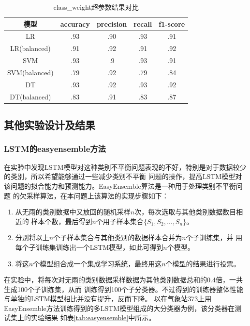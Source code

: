 \documentclass[UTF8]{ctexart}
\begin{document}
\begin{table}[htb]
  \centering
  \begin{minipage}[t]{\linewidth}
  \centering
  \caption{class\_weight超参数结果对比}
  \label{tab:class}
    \begin{tabular}{ccccc}
      \toprule[1pt]
      模型 & accuracy & precision & recall & f1-score \\
      \midrule[0.5pt]
      LR & .93 & .90 & .93 & .91\\
      LR(balanced) &  .91 & .92 &.91 &.92 \\
      SVM &.93 &.9 &.93 & .91   \\
      SVM(balanced) & .79 & .92& .79& .84 \\
      DT & .93 & .92 & .93 & .92\\
      DT(balanced) & .83 &.91 &.83 &.87 \\
      \bottomrule[1pt]
    \end{tabular}
  \end{minipage}
\end{table}

\subsection{其他实验设计及结果}
\subsubsection{LSTM的easyensemble方法}
在实验中发现LSTM模型对这种类别不平衡问题表现的不好，特别是对于数据较少的类别，所以希望能够通过一些减少类别不平衡
问题的操作，提高LSTM模型对该问题的拟合能力和预测能力。EasyEnsemble算法是一种用于处理类别不平衡问题
的欠采样算法，在本问题上该算法的实现步骤如下：
\begin{enumerate}[(1)]
  \item 从无雨的类别数据中又放回的随机采样$n$次，每次选取与其他类别数据数目相近的
  样本个数，最后得到$n$个用子样本集合$\{S_1, S_2, \dots, S_n\}$。
  \item 分别将以上$n$个子样本集合与其他类别的数据样本合并为$n$个子训练集，并
  用每个子训练集训练出一个LSTM模型，如此可得到$n$个模型。
  \item 将这$n$个模型组合成一个集成学习系统，最终用这$n$个模型的结果进行投票。
\end{enumerate}

在实验中，将每次对无雨的类别数据采样数据为其他类别数据总和的0.4倍，一共生成100个子训练集，从而
训练得到100个子分类器。不过得到的训练器整体性能与单独的LSTM模型相比并没有提升，反而下降。
以在气象站373上用EasyEnsemble方法训练得到的多LSTM模型组成的大分类器为例，该分类器在测试集上的实验结果
如表\ref{tab:easyensemble}中所示。
\end{document}

